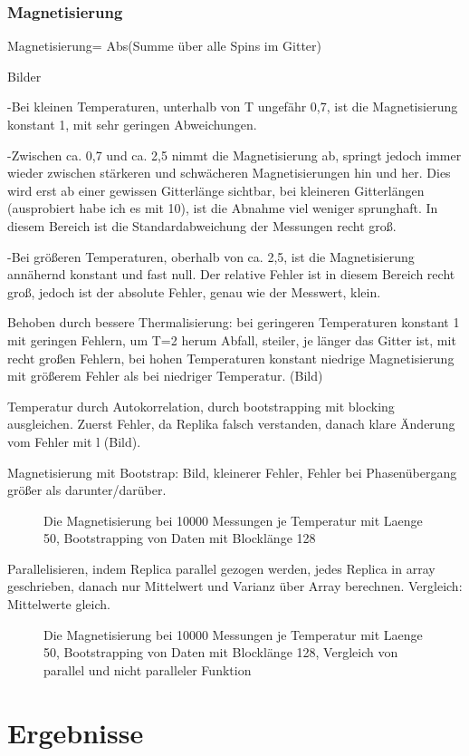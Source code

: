 \documentclass{scrreprt}
\begin{document}
	\subsection{Magnetisierung}
	Magnetisierung= Abs(Summe über alle Spins im Gitter)
	
	Bilder
	
	-Bei kleinen Temperaturen, unterhalb von T ungefähr 0,7, ist die
	 Magnetisierung konstant 1, mit sehr geringen Abweichungen.
	 
	 -Zwischen ca. 0,7 und ca. 2,5 nimmt die Magnetisierung ab, springt jedoch
	 immer wieder zwischen stärkeren und schwächeren Magnetisierungen hin und
	 her. Dies wird erst ab einer gewissen Gitterlänge sichtbar, bei kleineren
	 Gitterlängen (ausprobiert habe ich es mit 10), ist die Abnahme viel weniger
	 sprunghaft. In diesem Bereich ist die Standardabweichung der Messungen recht
	 groß.
	 
	 -Bei größeren Temperaturen, oberhalb von ca. 2,5, ist die Magnetisierung
	 annähernd konstant und fast null. Der relative Fehler ist in diesem Bereich
	 recht groß, jedoch ist der absolute Fehler, genau wie der Messwert, klein.
	 
	 Behoben durch bessere Thermalisierung: bei geringeren Temperaturen konstant 1 mit geringen Fehlern, 
	 um T=2 herum Abfall, steiler, je länger das Gitter ist, mit recht großen Fehlern, bei hohen Temperaturen konstant niedrige Magnetisierung mit größerem Fehler als bei niedriger Temperatur. (Bild)
	 
	 
	 Temperatur durch Autokorrelation, durch bootstrapping mit blocking ausgleichen. 
	 Zuerst Fehler, da Replika falsch verstanden, danach klare Änderung vom Fehler mit l (Bild).
	 
	 Magnetisierung mit Bootstrap: Bild, kleinerer Fehler, Fehler bei Phasenübergang größer als darunter/darüber.
	\begin{figure}
		
		\label{fig:magnetisierungbootstrap-l-128}
		\caption{Die Magnetisierung bei 10000 Messungen je Temperatur mit Laenge 50, Bootstrapping von Daten mit Blocklänge 128}
	\end{figure}
		
	Parallelisieren, indem Replica parallel gezogen werden, jedes Replica in array geschrieben, danach nur Mittelwert und Varianz über Array berechnen.
	Vergleich: Mittelwerte gleich.
	\begin{figure}
		
		\label{fig:bootstrapparallel-l-128}
		\caption{Die Magnetisierung bei 10000 Messungen je Temperatur mit Laenge 50, Bootstrapping von Daten mit Blocklänge 128, Vergleich von parallel und nicht paralleler Funktion}
	\end{figure}	
	
		
	\chapter{Ergebnisse}
	\listoffigures
	\listoftables
	
	
	
	\printbibliography[heading=bibintoc]
\end{document}
